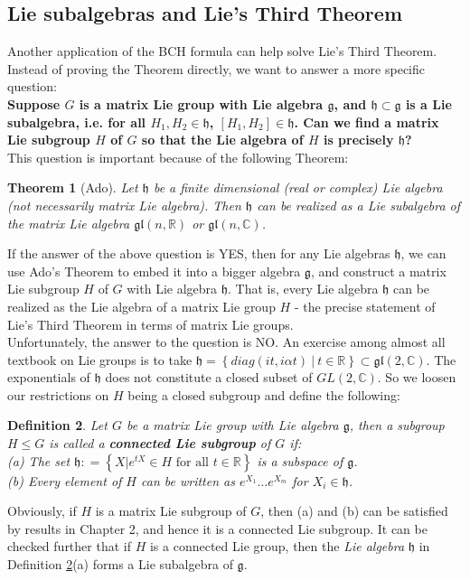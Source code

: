 \documentclass[11pt]{article}
\newtheorem{theorem}{Theorem}[section]
\newtheorem{definition}[theorem]{Definition}
\newcommand{\bb}[1]{\mathbb{#1}}
\newcommand{\mf}[1]{\mathfrak{#1}}
\begin{document}
\subsection{Lie subalgebras and Lie's Third Theorem}
Another application of the BCH formula can help solve Lie's Third Theorem. Instead of proving the Theorem directly, we want to answer a more specific question:\\
\textbf{Suppose $G$ is a matrix Lie group with Lie algebra $\mf{g}$, and $\mf{h} \subset \mf{g}$ is a Lie subalgebra, i.e. for all $H_1, H_2 \in \mf{h}$, $[H_1, H_2] \in \mf{h}$. Can we find a matrix Lie subgroup $H$ of $G$ so that the Lie algebra of $H$ is precisely $\mf{h}$?}\\
This question is important because of the following Theorem:
\begin{theorem}[Ado]
Let $\mf{h}$ be a finite dimensional (real or complex) Lie algebra (not necessarily matrix Lie algebra). Then $\mf{h}$ can be realized as a Lie subalgebra of the matrix Lie algebra $\mf{gl}(n,\bb{R})$ or $\mf{gl}(n,\bb{C})$.
\end{theorem}
If the answer of the above question is YES, then for any Lie algebras $\mf{h}$, we can use Ado's Theorem to embed it into a bigger algebra $\mf{g}$, and construct a matrix Lie subgroup $H$ of $G$ with Lie algebra $\mf{h}$. That is, every Lie algebra $\mf{h}$ can be realized as the Lie algebra of a matrix Lie group $H$ - the precise statement of Lie's Third Theorem in terms of matrix Lie groups.\\

\noindent Unfortunately, the answer to the question is NO. An exercise among almost all textbook on Lie groups is to take $\mf{h} = \left\{ diag(it, i\alpha t)\ \Big|\ t \in \bb{R} \right\} \subset \mf{gl}(2,\bb{C})$. The exponentials of $\mf{h}$ does not constitute a closed subset of $GL(2,\bb{C})$. So we loosen our restrictions on $H$ being a closed subgroup and define the following:
\begin{definition} \label{cls}
Let $G$ be a matrix Lie group with Lie algebra $\mf{g}$, then a subgroup $H \leq G$ is called a \textbf{connected Lie subgroup} of $G$ if:\\
(a) The set $\mf{h} : = \left\{X | e^{tX} \in H \text{ for all } t \in \bb{R} \right\}$ is a subspace of $\mf{g}$.\\
(b) Every element of $H$ can be written as $e^{X_1} \dots e^{X_m}$ for $X_i \in \mf{h}$.\\
\end{definition}
Obviously, if $H$ is a matrix Lie subgroup of $G$, then (a) and (b) can be satisfied by results in Chapter 2, and hence it is a connected Lie subgroup. It can be checked further that if $H$ is a connected Lie group, then the \textit{Lie algebra} $\mf{h}$ in Definition \ref{cls}(a) forms a Lie subalgebra of $\mf{g}$.\\
\end{document}
